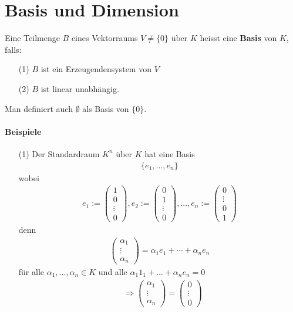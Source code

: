 \documentclass[11pt]{report}
\newcommand*\f[1] {\textbf{#1}}
\begin{document}
\section{Basis und Dimension}
Eine Teilmenge $B$ eines Vektorraums $V\neq\{0\}$ über $K$ heisst eine \f{Basis} von $K$, falls:
\begin{itemize}
 \item[(1)] $B$ ist ein Erzeugendensystem von $V$
 \item[(2)] $B$ ist linear unabhängig.
\end{itemize}
Man definiert auch $\emptyset$ als Basis von $\{0\}$.

\paragraph{Beispiele}
\begin{itemize}
 \item[(1)] Der Standardraum $K^n$ über $K$ hat eine Basis
\begin{align}
 \{e_1, ..., e_n\}
\end{align}
wobei
\begin{align}
 e_1 := \begin{pmatrix} 1 \\ 0 \\ \vdots \\ 0 \end{pmatrix},  e_2 := \begin{pmatrix} 0 \\ 1 \\ \vdots \\ 0 \end{pmatrix}, ...,  e_n := \begin{pmatrix} 0 \\ \vdots \\ 0 \\ 1 \end{pmatrix}
\end{align}
denn
\begin{align}
  \begin{pmatrix} \alpha_1 \\ \vdots \\ \alpha_n \end{pmatrix} = \alpha_1 e_1 + \cdots + \alpha_n e_n 
\end{align}
für alle $\alpha_1, ..., \alpha_n \in K$ und alle $\alpha_1 1_1 + ...+ \alpha_n e_n = 0$
\begin{align}
 &\Rightarrow \begin{pmatrix} \alpha_1 \\ \vdots \\ \alpha_n \end{pmatrix} = \begin{pmatrix} 0 \\ \vdots \\ 0 \end{pmatrix} \\

\end{align}
\end{itemize}
\end{document}
